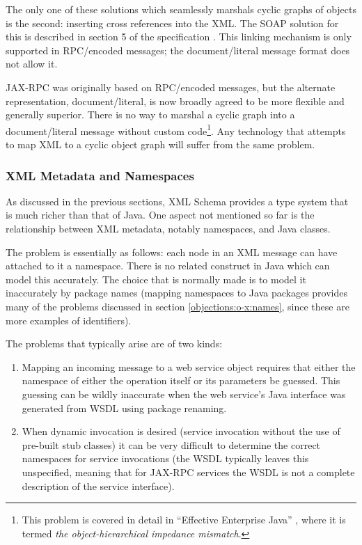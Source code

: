 The only one of these solutions which seamlessly marshals cyclic
graphs of objects is the second: inserting cross references into the
XML. The SOAP solution for this is described in section 5 of the
specification \cite{spec:SOAP1.1}. This linking mechanism is only
supported in RPC/encoded messages; the document/literal message format
does not allow it.

JAX-RPC was originally based on RPC/encoded messages, but the
alternate representation, document/literal, is now broadly agreed to
be more flexible and generally superior. There is no way to marshal a
cyclic graph into a document/literal message without custom
code\footnote{This problem is covered in detail in ``Effective
Enterprise Java'' \cite{neward:EEJ}, where it is termed
\emph{the object-hierarchical impedance mismatch}.}. Any technology
that attempts to map XML to a cyclic object graph will suffer from the
same problem.

\subsubsection{XML Metadata and Namespaces}
\label{objections:o-x:namespaces}

As discussed in the previous sections, XML Schema provides a type
system that is much richer than that of Java. One aspect not mentioned
so far is the relationship between XML metadata, notably namespaces,
and Java classes.

The problem is essentially as follows: each node in an XML message can
have attached to it a namespace. There is no related construct in Java
which can model this accurately. The choice that is normally made is
to model it inaccurately by package names (mapping namespaces to Java
packages provides many of the problems discussed in section
\ref{objections:o-x:names}, since these are more examples of identifiers). 

The problems that typically arise are of two kinds:

\begin{enumerate}

\item Mapping an incoming message to a web service object requires
that either the namespace of either the operation itself or its
parameters be guessed. This guessing can be wildly inaccurate when the
web service's Java interface was generated from WSDL using package
renaming.

\item When dynamic invocation is desired (service invocation without
the use of pre-built stub classes) it can be very difficult to
determine the correct namespaces for service invocations (the WSDL
typically leaves this unspecified, meaning that for JAX-RPC services
the WSDL is not a complete description of the service interface).

\end{enumerate}

